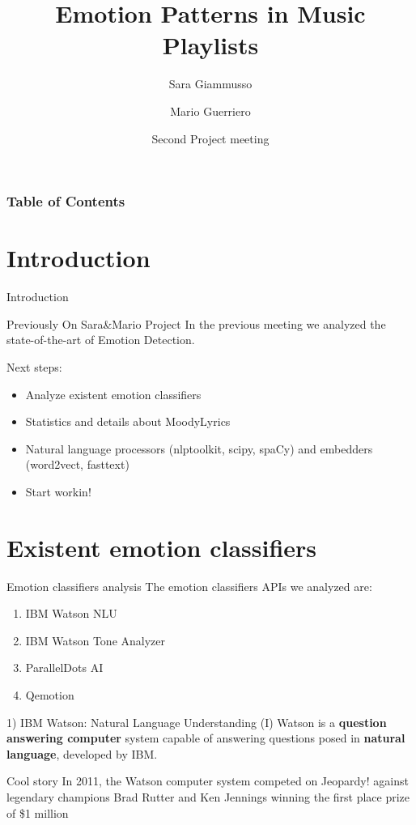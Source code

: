\documentclass[xcolor=dvipsnames]{beamer}
\title[Emotion Patterns in Music Playlists] %
{Emotion Patterns in Music Playlists}
\author[Sara, Mario] %
{Sara Giammusso\inst{1}\inst{2} \and Mario Guerriero \inst{1}\inst{2}}
\institute[EURECOM] %
{
 \inst{1}
 MSc student in Data Science Department, EURECOM, T\'el\'ecom ParisTech, France\\
  \inst{2}%
 MSc student in Department of Control and Computer Engineering, Politecnico di Torino, Italy
}
\date[2018 March 27] %
{Second Project meeting}
\begin{document}
\frame{\titlepage}

\begin{frame}
\frametitle{Table of Contents}
\tableofcontents
\end{frame}

\section{Introduction}
\begin{frame}{Introduction}
\begin{block}{Previously On Sara\&Mario Project}
In the previous meeting we analyzed the state-of-the-art of Emotion Detection.\\
\end{block}
Next steps:
\begin{itemize}
\item Analyze existent emotion classifiers
\item Statistics and details about MoodyLyrics
\item Natural language processors (nlptoolkit, scipy, spaCy) and embedders (word2vect, fasttext)
\item Start workin!
\end{itemize}
\end{frame}

\section{Existent emotion classifiers}

\begin{frame}{Emotion classifiers analysis}
The emotion classifiers APIs we analyzed are: 
\begin{enumerate}
\item IBM Watson NLU
\item IBM Watson Tone Analyzer
\item ParallelDots AI
\item Qemotion
\end{enumerate}
\end{frame}

\begin{frame}{1) IBM Watson: Natural Language Understanding (I)}
Watson is a \textbf{question answering computer} system capable of answering questions posed in \textbf{natural language}, developed by IBM.\cite{p2}
\begin{block}{Cool story}
In 2011, the Watson computer system competed on Jeopardy! against legendary champions Brad Rutter and Ken Jennings winning the first place prize of \$1 million \cite{p2}
\end{block}
\end{frame}
\end{document}
